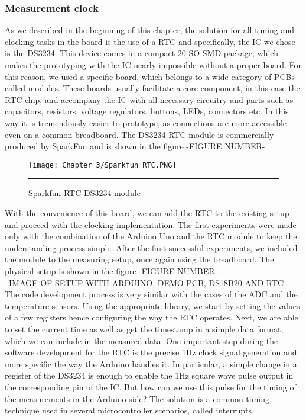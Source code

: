 \subsubsection{Measurement clock}
As we described in the beginning of this chapter, the solution for all timing and clocking tasks in the board is the use of a RTC and specifically, the IC we chose is the DS3234. This device comes in a compact 20-SO SMD package, which makes the prototyping with the IC nearly impossible without a proper board. For this reason, we used a specific board, which belongs to a wide category of PCBs called modules. These boards usually facilitate a core component, in this case the RTC chip, and accompany the IC with all necessary circuitry and parts such as capacitors, resistors, voltage regulators, buttons, LEDs, connectors etc. In this way it is tremendously easier to prototype, as connections are more accessible even on a common breadboard. The DS3234 RTC module is commercially produced by SparkFun and is shown in the figure -FIGURE NUMBER-.\\


\begin{figure}[htbp]
	\centering
		\texttt{[image: Chapter\_3/Sparkfun\_RTC.PNG]}
		\rule{35em}{0.5pt}
	\caption{Sparkfun RTC DS3234 module}
	\label{fig:Sparkfun_RTC}
\end{figure}

With the convenience of this board, we can add the RTC to the existing setup and proceed with the clocking implementation. The first experiments were made only with the combination of the Arduino Uno and the RTC module to keep the understanding process simple. After the first successful experiments, we included the module to the measuring setup, once again using the breadboard. The physical setup is shown in the figure -FIGURE NUMBER-.\\

--IMAGE OF SETUP WITH ARDUINO, DEMO PCB, DS18B20 AND RTC \\

The code development process is very similar with the cases of the ADC and the temperature sensors. Using the appropriate library, we start by setting the values of a few registers hence configuring the way the RTC operates. Next, we are able to set the current time as well as get the timestamp in a simple data format, which we can include in the measured data. One important step during the software development for the RTC is the precise 1Hz clock signal generation and more specific the way the Arduino handles it. In particular, a simple change in a register of the DS3234 is enough to enable the 1Hz square wave pulse output in the corresponding pin of the IC. But how can we use this pulse for the timing of the measurements in the Arduino side? The solution is a common timing technique used in several microcontroller scenarios, called interrupts.

